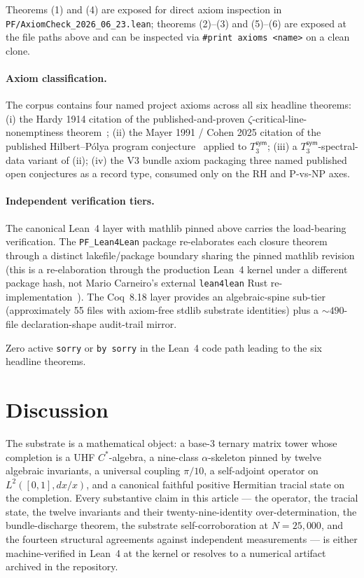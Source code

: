 \documentclass[11pt,a4paper]{amsart}
\theoremstyle{plain}
\theoremstyle{definition}
\begin{document}
Theorems (1) and (4) are exposed for direct axiom inspection in \texttt{PF/AxiomCheck\_2026\_06\_23.lean}; theorems (2)--(3) and (5)--(6) are exposed at the file paths above and can be inspected via \texttt{\#print axioms <name>} on a clean clone.

\paragraph{Axiom classification.} The corpus contains four named project axioms across all six headline theorems: (i) the Hardy 1914 citation of the published-and-proven $\zeta$-critical-line-nonemptiness theorem~\cite{hardy1914}; (ii) the Mayer 1991 / Cohen 2025 citation of the published Hilbert--P\'olya program conjecture~\cite{mayer1991,cohen2025transferOp} applied to $T_3^{\textsf{sym}}$; (iii) a $T_3^{\textsf{sym}}$-spectral-data variant of (ii); (iv) the V3 bundle axiom packaging three named published open conjectures as a record type, consumed only on the RH and P-vs-NP axes.

\paragraph{Independent verification tiers.} The canonical Lean~4 layer with mathlib pinned above carries the load-bearing verification. The \texttt{PF\_Lean4Lean} package re-elaborates each closure theorem through a distinct lakefile/package boundary sharing the pinned mathlib revision (this is a re-elaboration through the production Lean~4 kernel under a different package hash, not Mario Carneiro's external \texttt{lean4lean} Rust re-implementation~\cite{carneiro2024}). The Coq~8.18 layer provides an algebraic-spine sub-tier (approximately 55 files with axiom-free stdlib substrate identities) plus a $\sim 490$-file declaration-shape audit-trail mirror.

Zero active \texttt{sorry} or \texttt{by sorry} in the Lean~4 code path leading to the six headline theorems.

\section{Discussion}\label{sec:conclusion}

The substrate is a mathematical object: a base-3 ternary matrix tower whose completion is a UHF $C^*$-algebra, a nine-class $\alpha$-skeleton pinned by twelve algebraic invariants, a universal coupling $\pi/10$, a self-adjoint operator on $L^2([0,1], dx/x)$, and a canonical faithful positive Hermitian tracial state on the completion. Every substantive claim in this article --- the operator, the tracial state, the twelve invariants and their twenty-nine-identity over-determination, the bundle-discharge theorem, the substrate self-corroboration at $N = 25{,}000$, and the fourteen structural agreements against independent measurements --- is either machine-verified in Lean~4 at the kernel or resolves to a numerical artifact archived in the repository.
\end{document}
